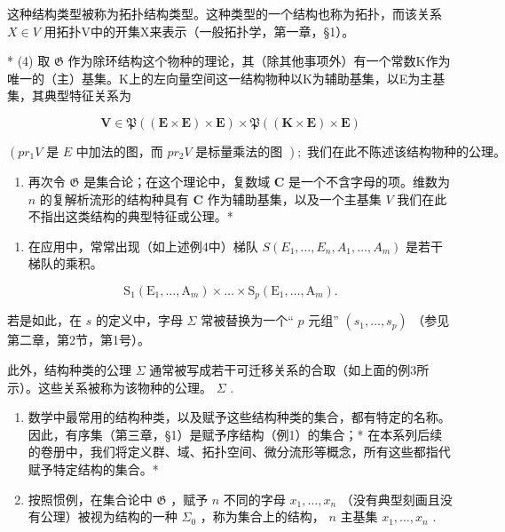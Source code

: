 这种结构类型被称为拓扑结构类型。这种类型的一个结构也称为拓扑，而该关系 \(X \in V\) 用拓扑V中的开集X来表示（一般拓扑学，第一章，§1）。

* (4) 取 \(\mathfrak{G}\) 作为除环结构这个物种的理论，其（除其他事项外）有一个常数K作为唯一的（主）基集。K上的左向量空间这一结构物种以K为辅助基集，以E为主基集，其典型特征关系为

\[
\mathbf {V} \in \mathfrak {P} ((\mathbf {E} \times \mathbf {E}) \times \mathbf {E}) \times \mathfrak {P} ((\mathbf {K} \times \mathbf {E}) \times \mathbf {E})
\]

\((pr_{1}V \text{ 是 } E \text{ 中加法的图，而 } pr_{2}V \text{ 是标量乘法的图 }); \text{ 我们在此不陈述该结构物种的公理。}\)

\begin{enumerate}
\def\labelenumi{(\arabic{enumi})}
\setcounter{enumi}{4}
\tightlist
\item
  再次令 \(\mathfrak{G}\) 是集合论；在这个理论中，复数域 \(\mathbf{C}\) 是一个不含字母的项。维数为 \(n\) 的复解析流形的结构种具有 \(\mathbf{C}\) 作为辅助基集，以及一个主基集 \(V\) 我们在此不指出这类结构的典型特征或公理。*
\end{enumerate}


\begin{enumerate}
\def\labelenumi{(\arabic{enumi})}
\tightlist
\item
  在应用中，常常出现（如上述例4中）梯队 \(S(E_1, \ldots, E_n, A_1, \ldots, A_m)\) 是若干梯队的乘积。
\end{enumerate}

\[
\mathrm{S} _ {1} \left(\mathrm{E} _ {1}, \dots , \mathrm{A} _ {m}\right) \times \dots \times \mathrm{S} _ {p} \left(\mathrm{E} _ {1}, \dots , \mathrm{A} _ {m}\right).
\]

若是如此，在 \(s\) 的定义中，字母 \(\Sigma\) 常被替换为一个“ \(p\) 元组” \((s_{1}, \ldots, s_{p})\) （参见第二章，第2节，第1号）。

此外，结构种类的公理 \(\Sigma\) 通常被写成若干可迁移关系的合取（如上面的例3所示）。这些关系被称为该物种的公理。 \(\Sigma\) .

\begin{enumerate}
\def\labelenumi{(\arabic{enumi})}
\setcounter{enumi}{1}
\item
  数学中最常用的结构种类，以及赋予这些结构种类的集合，都有特定的名称。因此，有序集（第三章，§1）是赋予序结构（例1）的集合；* 在本系列后续的卷册中，我们将定义群、域、拓扑空间、微分流形等概念，所有这些都指代赋予特定结构的集合。*
\item
  按照惯例，在集合论中 \(\mathfrak{G}\) ，赋予 \(n\) 不同的字母 \(x_{1},\ldots,x_{n}\) （没有典型刻画且没有公理）被视为结构的一种 \(\Sigma_{0}\) ，称为集合上的结构， \(n\) 主基集 \(x_{1},\ldots,x_{n}\) .
\end{enumerate}

